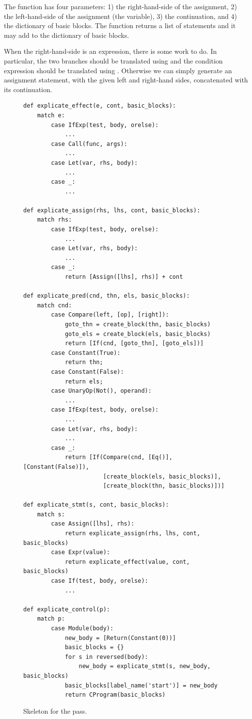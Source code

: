 \documentclass[7x10]{TimesAPriori_MIT}%
\begin{document}
{The  function has four parameters: 1) the
right-hand-side of the assignment, 2) the left-hand-side of the
assignment (the variable), 3) the continuation, and 4) the dictionary
of basic blocks. The  function returns a list
of \LangCIf{} statements and it may add to the dictionary of basic
blocks.

When the right-hand-side is an  expression, there is some
work to do. In particular, the two branches should be translated using
 and the condition expression should be
translated using .  Otherwise we can simply
generate an assignment statement, with the given left and right-hand
sides, concatenated with its continuation.

\begin{figure}[tbp]
\begin{lstlisting}[basicstyle=\ttfamily\footnotesize]
def explicate_effect(e, cont, basic_blocks):
    match e:
        case IfExp(test, body, orelse):
            ...
        case Call(func, args):
            ...
        case Let(var, rhs, body):
            ...
        case _:
            ...

def explicate_assign(rhs, lhs, cont, basic_blocks):
    match rhs:
        case IfExp(test, body, orelse):
            ...
        case Let(var, rhs, body):
            ...
        case _:
            return [Assign([lhs], rhs)] + cont

def explicate_pred(cnd, thn, els, basic_blocks):
    match cnd:
        case Compare(left, [op], [right]):
            goto_thn = create_block(thn, basic_blocks)
            goto_els = create_block(els, basic_blocks)
            return [If(cnd, [goto_thn], [goto_els])]
        case Constant(True):
            return thn;
        case Constant(False):
            return els;
        case UnaryOp(Not(), operand):
            ...
        case IfExp(test, body, orelse):
            ...
        case Let(var, rhs, body):
            ...
        case _:
            return [If(Compare(cnd, [Eq()], [Constant(False)]),
                       [create_block(els, basic_blocks)],
                       [create_block(thn, basic_blocks)])]

def explicate_stmt(s, cont, basic_blocks):
    match s:
        case Assign([lhs], rhs):
            return explicate_assign(rhs, lhs, cont, basic_blocks)
        case Expr(value):
            return explicate_effect(value, cont, basic_blocks)
        case If(test, body, orelse):
            ...

def explicate_control(p):
    match p:
        case Module(body):
            new_body = [Return(Constant(0))]
            basic_blocks = {}
            for s in reversed(body):
                new_body = explicate_stmt(s, new_body, basic_blocks)
            basic_blocks[label_name('start')] = new_body
            return CProgram(basic_blocks)
\end{lstlisting}
\caption{Skeleton for the  pass.}
\label{fig:explicate-control-Lif}
\end{figure}
\fi}
\end{document}
